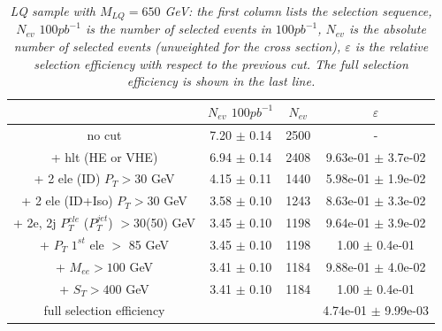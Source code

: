 \begin{table}[htbp]
\begin{center}
\begin{tabular}{|c|c|c|c|}
\hline
\hline
 & $N_{ev}$ $100pb^{-1}$ & $N_{ev}$ & $\varepsilon$ \\
\hline
\hline

no cut &7.20 $\pm$ 0.14& 2500 & - \\
+ hlt (HE or VHE) &6.94 $\pm$ 0.14& 2408 & 9.63e-01 $\pm$ 3.7e-02\\
+ 2 ele (ID) $P_{T} >30$ GeV &4.15 $\pm$ 0.11& 1440 & 5.98e-01 $\pm$ 1.9e-02\\
+ 2 ele (ID+Iso) $P_{T} >30$ GeV &3.58 $\pm$ 0.10 & 1243 & 8.63e-01 $\pm$ 3.3e-02\\
+ 2e, 2j $P_{T}^{ele}$ ($P_{T}^{jet}$) $>$30(50) GeV &3.45 $\pm$ 0.10& 1198 & 9.64e-01 $\pm$ 3.9e-02\\
+ $P_{T}$ $1^{st}$ ele $>$ 85 GeV &3.45 $\pm$ 0.10& 1198 & 1.00 $\pm$ 0.4e-01\\
+ $M_{ee} >100$ GeV&3.41 $\pm$ 0.10& 1184 & 9.88e-01 $\pm$ 4.0e-02\\
+ $S_{T} >400$ GeV &3.41 $\pm$ 0.10& 1184 & 1.00 $\pm$ 0.4e-01\\
\hline

full selection efficiency& &  & 4.74e-01 $\pm$ 9.99e-03\\
\hline
\end{tabular}
\end{center}
\caption{\small \sl LQ sample with $M_{LQ}=650$ GeV: the first column lists the selection sequence, $N_{ev}$ $100pb^{-1}$ is the number of selected events in $100pb^{-1}$, $N_{ev}$ is the absolute number of selected events (unweighted for the cross section), $\varepsilon$ is the relative selection efficiency with respect to the previous cut. The full selection efficiency is shown in the last line.}
\label{tab:selection_effic_650}
\end{table}



